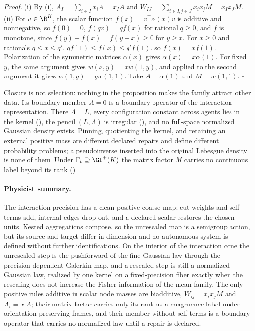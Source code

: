 \noindent\emph{Proof.}
(i) By (i),
\(A_I=\sum_{i\in I}x_iA=x_IA\) and \(W_{IJ}=\sum_{i\in I,j\in J}x_ix_jM=x_Ix_JM\).
(ii) For \(v\in\R^K\), the scalar function \(f(x)=v^\top\alpha(x)v\) is additive and
nonnegative, so \(f(0)=0\), \(f(qx)=qf(x)\) for rational \(q\geq0\), and \(f\) is monotone,
since \(f(y)-f(x)=f(y-x)\geq0\) for \(y\geq x\). For \(x\geq0\) and rationals
\(q\leq x\leq q'\), \(qf(1)\leq f(x)\leq q'f(1)\), so \(f(x)=xf(1)\). Polarization of the
symmetric matrices \(\alpha(x)\) gives \(\alpha(x)=x\alpha(1)\). For fixed \(y\), the same
argument gives \(w(x,y)=xw(1,y)\), and applied to the second argument it gives
\(w(1,y)=yw(1,1)\). Take \(A=\alpha(1)\) and \(M=w(1,1)\). \hfill$\square$

\medskip
Closure is not selection: nothing in the proposition makes the family attract other
data. Its boundary member \(A=0\) is a boundary operator of the interaction
representation. There \(\Lambda=L\), every configuration constant across agents lies
in the kernel (), the pencil
\((L,\Lambda)\) is irregular (), and no full-space
normalized Gaussian density exists. Pinning, quotienting the kernel, and retaining an
external positive mass are different declared repairs and define different probability
problems; a pseudoinverse inserted into the original Lebesgue density is none of them.
Under \(\Gamma_b\supseteq\GL^+(K)\) the matrix factor \(M\) carries no continuous label
beyond its rank ().

\paragraph{Physicist summary.}
The interaction precision has a clean positive coarse map: cut weights and self terms
add, internal edges drop out, and a declared scalar restores the chosen units. Nested
aggregations compose, so the unrescaled map is a semigroup action, but its source and
target differ in dimension and no autonomous system is defined without further
identifications. On the interior of the interaction cone the unrescaled step is the
pushforward of the fine Gaussian law through the precision-dependent Galerkin map, and
a rescaled step is still a normalized Gaussian law, realized by one kernel on a
fixed-precision fiber exactly when the rescaling does not increase the Fisher
information of the mean family. The
only positive rules additive in scalar node masses are biadditive,
\(W_{ij}=x_ix_jM\) and \(A_i=x_iA\); their matrix factor carries only its rank as a
congruence label under orientation-preserving frames, and their member without self
terms is a boundary operator that carries no normalized law until a repair is declared.
